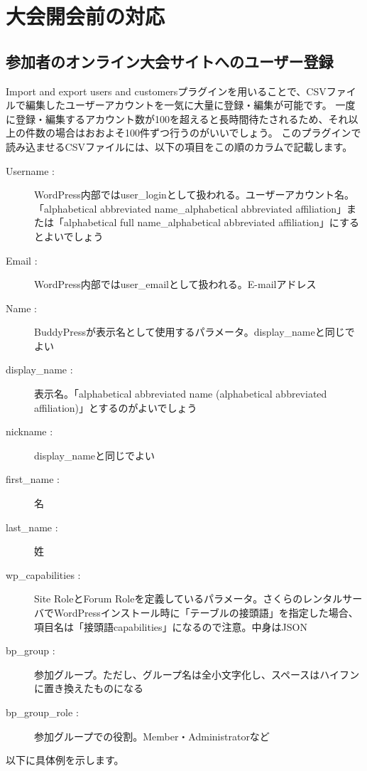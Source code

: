 \documentclass[titlepage,10pt,a4paper,uplatex]{jsbook}
\begin{document}
\section{大会開会前の対応}

\subsection{参加者のオンライン大会サイトへのユーザー登録}

Import and export users and customersプラグインを用いることで、CSVファイルで編集したユーザーアカウントを一気に大量に登録・編集が可能です。
一度に登録・編集するアカウント数が100を超えると長時間待たされるため、それ以上の件数の場合はおおよそ100件ずつ行うのがいいでしょう。
このプラグインで読み込ませるCSVファイルには、以下の項目をこの順のカラムで記載します。

\begin{description}
\item[Username : ] WordPress内部ではuser\_loginとして扱われる。ユーザーアカウント名。「alphabetical abbreviated name\_alphabetical abbreviated affiliation」または「alphabetical full name\_alphabetical abbreviated affiliation」にするとよいでしょう
\item[Email : ] WordPress内部ではuser\_emailとして扱われる。E-mailアドレス
\item[Name : ] BuddyPressが表示名として使用するパラメータ。display\_nameと同じでよい
\item[display\_name : ] 表示名。「alphabetical abbreviated name (alphabetical abbreviated affiliation)」とするのがよいでしょう
\item[nickname : ] display\_nameと同じでよい
\item[first\_name : ] 名
\item[last\_name : ] 姓
\item[wp\_capabilities : ] Site RoleとForum Roleを定義しているパラメータ。さくらのレンタルサーバでWordPressインストール時に「テーブルの接頭語」を指定した場合、項目名は「接頭語capabilities」になるので注意。中身はJSON
\item[bp\_group : ] 参加グループ。ただし、グループ名は全小文字化し、スペースはハイフンに置き換えたものになる
\item[bp\_group\_role : ] 参加グループでの役割。Member・Administratorなど
\end{description}

以下に具体例を示します。
\end{document}
